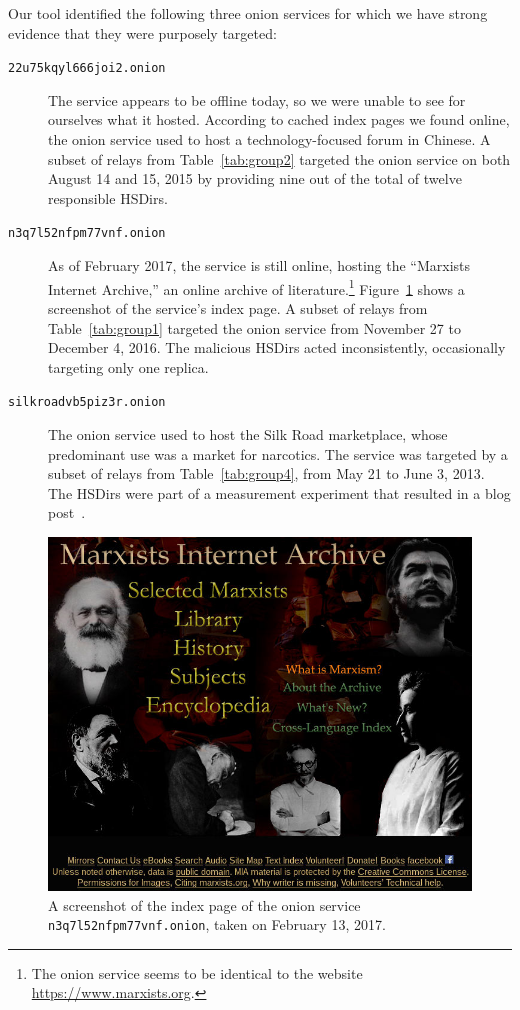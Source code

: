 Our tool identified the following three onion services for which we have strong
evidence that they were purposely targeted:

\begin{description}
	\item[\texttt{22u75kqyl666joi2.onion}] The service appears to be offline
		today, so we were unable to see for ourselves what it hosted.  According
		to cached index pages we found online, the onion service used to host a
		technology-focused forum in Chinese.  A subset of relays from
		Table~\ref{tab:group2} targeted the onion service on both August 14 and
		15, 2015 by providing nine out of the total of twelve responsible
		HSDirs.

	\item[\texttt{n3q7l52nfpm77vnf.onion}] As of February 2017, the service is
		still online, hosting the ``Marxists Internet Archive,'' an online
		archive of literature.\footnote{The onion service seems to be identical
		to the website \url{https://www.marxists.org}.} Figure~\ref{fig:archive}
		shows a screenshot of the service's index page.  A subset of relays from
		Table~\ref{tab:group1} targeted the onion service from November 27 to
		December 4, 2016.  The malicious HSDirs acted inconsistently,
		occasionally targeting only one replica.

	\item[\texttt{silkroadvb5piz3r.onion}] The onion service used to host the
		Silk Road marketplace, whose predominant use was a market for narcotics.
		The service was targeted by a subset of relays from
		Table~\ref{tab:group4}, from May 21 to June 3, 2013.  The HSDirs were
		part of a measurement experiment that resulted in a blog
		post~\cite{OCearbhaill2013a}.
\end{description}

\begin{figure}[t]
	\centering
	\includegraphics[width=\linewidth]{figures/marxists-internet-archive.jpg}
	\caption{A screenshot of the index page of the onion service
		\texttt{n3q7l52nfpm77vnf.onion}, taken on February 13, 2017.}
	\label{fig:archive}
\end{figure}
